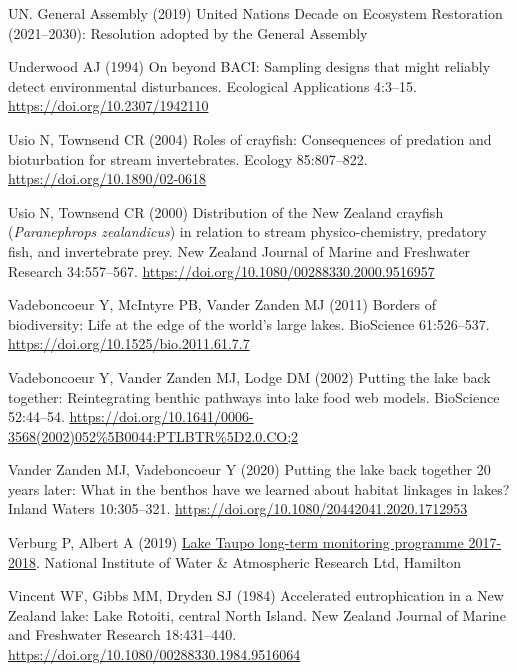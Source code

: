 \documentclass[
  12pt,
  a4paper,
]{scrbook}
\newlength{\cslhangindent}
\newenvironment{CSLReferences}[2] %
 {\begin{list}{}{%
  \setlength{\itemindent}{0pt}
  \setlength{\leftmargin}{0pt}
  \setlength{\parsep}{0pt}
  \ifodd #1
   \setlength{\leftmargin}{\cslhangindent}
   \setlength{\itemindent}{-1\cslhangindent}
  \fi
  \setlength{\itemsep}{#2\baselineskip}}}
 {\end{list}}
\begin{document}
\begin{CSLReferences}{1}{1}
UN. General Assembly (2019) {United Nations Decade} on {Ecosystem
Restoration} (2021--2030): Resolution adopted by the {General Assembly}

Underwood AJ (1994) On beyond {BACI}: Sampling designs that might
reliably detect environmental disturbances. Ecological Applications
4:3--15. \url{https://doi.org/10.2307/1942110}

Usio N, Townsend CR (2004) Roles of crayfish: Consequences of predation
and bioturbation for stream invertebrates. Ecology 85:807--822.
\url{https://doi.org/10.1890/02-0618}

Usio N, Townsend CR (2000) Distribution of the {New Zealand} crayfish
({\emph{Paranephrops zealandicus}}) in relation to stream
physico-chemistry, predatory fish, and invertebrate prey. New Zealand
Journal of Marine and Freshwater Research 34:557--567.
\url{https://doi.org/10.1080/00288330.2000.9516957}

Vadeboncoeur Y, McIntyre PB, Vander Zanden MJ (2011) Borders of
biodiversity: Life at the edge of the world's large lakes. BioScience
61:526--537. \url{https://doi.org/10.1525/bio.2011.61.7.7}

Vadeboncoeur Y, Vander Zanden MJ, Lodge DM (2002) Putting the lake back
together: Reintegrating benthic pathways into lake food web models.
BioScience 52:44--54.
\url{https://doi.org/10.1641/0006-3568(2002)052\%5B0044:PTLBTR\%5D2.0.CO;2}

Vander Zanden MJ, Vadeboncoeur Y (2020) Putting the lake back together
20 years later: What in the benthos have we learned about habitat
linkages in lakes? Inland Waters 10:305--321.
\url{https://doi.org/10.1080/20442041.2020.1712953}

Verburg P, Albert A (2019)
\href{https://www.waikatoregion.govt.nz/assets/WRC/TR201918.pdf}{{Lake
Taupo} long-term monitoring programme 2017-2018}. National Institute of
Water \& Atmospheric Research Ltd, Hamilton

Vincent WF, Gibbs MM, Dryden SJ (1984) Accelerated eutrophication in a
{New Zealand} lake: {Lake Rotoiti}, central {North Island}. New Zealand
Journal of Marine and Freshwater Research 18:431--440.
\url{https://doi.org/10.1080/00288330.1984.9516064}


\end{CSLReferences}
\end{document}
